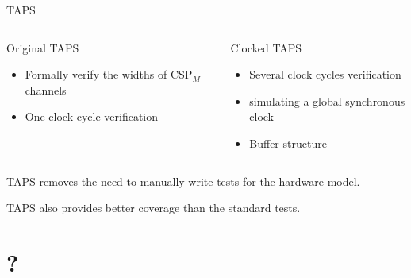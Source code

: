 \documentclass[11pt]{beamer}
\newcommand{\cspm}{CSP$_M$}
\begin{document}
\begin{frame}{TAPS}
    \begin{columns}[t, totalwidth=1.02\textwidth]

        \begin{column}{0.45\linewidth}
            \begin{block}{Original TAPS}
                \begin{itemize}

                    \item Formally verify the widths of \cspm{} channels
                    \item One clock cycle verification
                \end{itemize}
            \end{block}
        \end{column}

        \pause

        \begin{column}{0.45\linewidth}
            \begin{block}{Clocked TAPS}
                \begin{itemize}
                    \item Several clock cycles verification
                    \item simulating a global synchronous clock
                    \item Buffer structure
                \end{itemize}
            \end{block}
        \end{column}

    \end{columns}

\pause

  \begin{block}{}
     TAPS removes the need to manually write tests for the hardware model.
  \end{block}

  \pause

  \begin{block}{}
     TAPS also provides better coverage than the standard tests.
  \end{block}
\end{frame}


\section{?}
%
\end{document}
